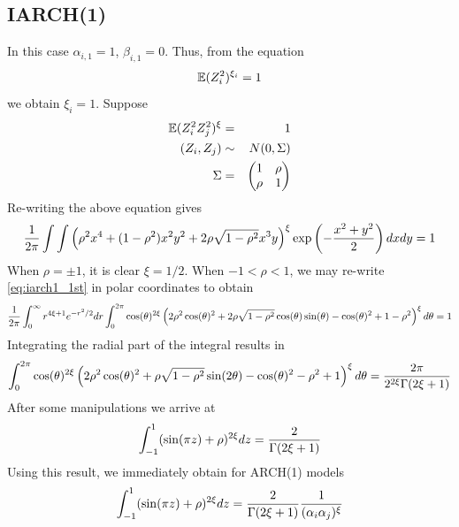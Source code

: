 \documentclass{article}
\begin{document}
\subsection{IARCH(1)}
In this case $\alpha_{i, 1} = 1$, $\beta_{i, 1} = 0$. Thus, from the equation
\begin{equation*}
  \mathbb{E} (Z_i^2)^{\xi_i} = 1
\end{equation*}
we obtain $\xi_i = 1$. Suppose
\begin{eqnarray*}
  \mathbb{E} (Z_i^2 Z_j^2)^\xi &=& 1 \\
  (Z_i, Z_j) &\sim& N(0, \Sigma) \\
  \Sigma &=&
  \begin{pmatrix}
    1 & \rho \\
    \rho & 1
  \end{pmatrix}
\end{eqnarray*}
Re-writing the above equation gives
\begin{equation}
  \label{eq:iarch1_1st}
  {1 \over 2\pi}
  \int \int
  \left(
    \rho^2 x^4 + (1 - \rho^2) x^2 y^2 + 2 \rho \sqrt{1 - \rho^2} x^3 y
  \right)^\xi
  \exp\left(
    -{x^2 + y^2 \over 2}
  \right)
  dx dy = 1
\end{equation}
When $\rho = \pm 1$, it is clear $\xi = 1/2$. When $-1 < \rho < 1$,
we may re-write \eqref{eq:iarch1_1st} in polar coordinates to obtain
\begin{equation*}
  {1 \over 2\pi} \int_0^{\infty} r^{4\xi + 1} e^{-r^2 / 2} dr
  \int_{0}^{2\pi} \cos(\theta)^{2 \xi}
  \left(
    2 \rho^2 \cos(\theta)^2
    + 2 \rho \sqrt{1 - \rho^2} \cos(\theta) \sin(\theta) - \cos(\theta)^2 + 1 - \rho^2
  \right)^\xi d\theta = 1
\end{equation*}
Integrating the radial part of the integral results in
\begin{equation*}
  \int_{0}^{2\pi}
  \cos(\theta)^{2\xi}
  \left(
    2 \rho^2 \cos(\theta)^2 + \rho \sqrt{1 - \rho^2} \sin(2\theta) - \cos(\theta)^2 - \rho^2 + 1
  \right)^\xi d\theta
  = {2 \pi
    \over
    2^{2 \xi} \Gamma(2\xi + 1)
  }
\end{equation*}
After some manipulations we arrive at
\begin{equation}
  \label{eq:iarch_2nd}
  \int_{-1}^1 (\sin(\pi z) + \rho)^{2\xi} dz = {2 \over \Gamma(2\xi + 1)}
\end{equation}
Using this result, we immediately obtain for ARCH(1) models
\begin{equation*}
  \label{eq:arch_1st}
  \int_{-1}^1 (\sin(\pi z) + \rho)^{2\xi} dz =
  {2 \over \Gamma(2\xi + 1)}
  {1 \over (\alpha_i \alpha_j)^\xi}
\end{equation*}
\end{document}
